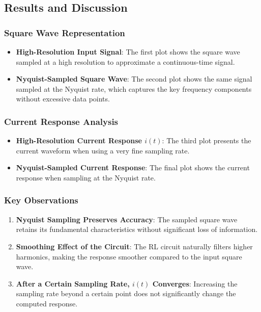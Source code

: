 \documentclass[journal]{IEEEtran}
\begin{document}
\subsection{Results and Discussion}
\subsubsection{Square Wave Representation}
\begin{itemize}
    \item \textbf{High-Resolution Input Signal}: The first plot shows the square wave sampled at a high resolution to approximate a continuous-time signal.
    \item \textbf{Nyquist-Sampled Square Wave}: The second plot shows the same signal sampled at the Nyquist rate, which captures the key frequency components without excessive data points.
\end{itemize}
\subsubsection{Current Response Analysis}
\begin{itemize}
    \item \textbf{High-Resolution Current Response $i(t)$}: The third plot presents the current waveform when using a very fine sampling rate.
    \item \textbf{Nyquist-Sampled Current Response}: The final plot shows the current response when sampling at the Nyquist rate.
\end{itemize}
\subsubsection{Key Observations}
\begin{enumerate}
    \item \textbf{Nyquist Sampling Preserves Accuracy}: The sampled square wave retains its fundamental characteristics without significant loss of information.
    \item \textbf{Smoothing Effect of the Circuit}: The RL circuit naturally filters higher harmonics, making the response smoother compared to the input square wave.
    \item \textbf{After a Certain Sampling Rate, $i(t)$ Converges}: Increasing the sampling rate beyond a certain point does not significantly change the computed response.
\end{enumerate}
\end{document}
